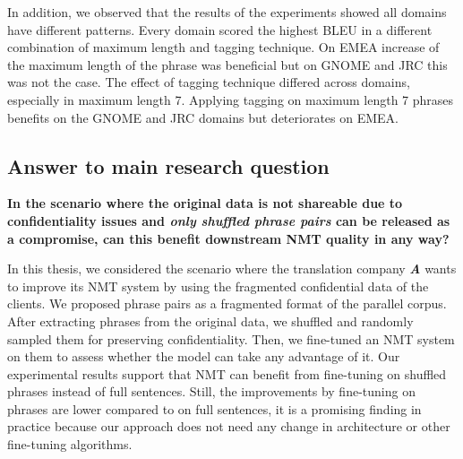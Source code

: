 In addition, we observed that the results of the experiments showed all domains have different patterns. Every domain scored the highest BLEU in a different combination of maximum length and tagging technique. On EMEA increase of the maximum length of the phrase was beneficial but on GNOME and JRC this was not the case. The effect of tagging technique differed across domains, especially in maximum length 7. Applying tagging on maximum length 7 phrases benefits on the GNOME and JRC domains but deteriorates on EMEA. 
\bigskip
\subsection{Answer to main research question}

\noindent \textbf{In the scenario where the original data is not shareable due to confidentiality issues and \textit{only shuffled phrase pairs} can be released as a compromise, can this benefit downstream NMT quality in any way?}

\bigskip

In this thesis, we considered the scenario where the translation company \textit{\textbf{A}} wants to improve its NMT system by using the fragmented confidential data of the clients. We proposed phrase pairs as a fragmented format of the parallel corpus. After extracting phrases from the original data, we shuffled and randomly sampled them for preserving confidentiality. Then, we fine-tuned an NMT system on them to assess whether the model can take any advantage of it. Our experimental results support that NMT can benefit from fine-tuning on shuffled phrases instead of full sentences. Still, the improvements by fine-tuning on phrases are lower compared to on full sentences, it is a promising finding in practice because our approach does not need any change in architecture or other fine-tuning algorithms.
\bigskip

